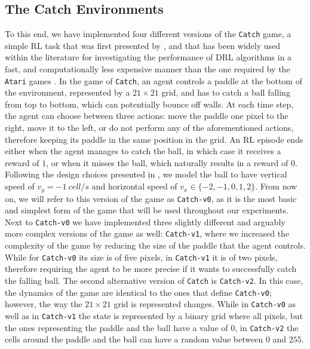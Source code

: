 \subsection{The Catch Environments}
\label{sec:catch_environments}

To this end, we have implemented four different versions of the \texttt{Catch} game, a simple RL task that was first presented by \citet{mnih2014recurrent}, and that has been widely used within the literature for investigating the performance of DRL algorithms in a fast, and computationally less expensive manner than the one required by the \texttt{Atari} games \cite{vanjos2018deep, aittahar2020empirical}. In the game of \texttt{Catch}, an agent controls a paddle at the bottom of the environment, represented by a $21 \times 21$ grid, and has to catch a ball falling from top to bottom, which can potentially bounce off walls.
At each time step, the agent can choose between three actions: move the paddle one pixel to the right, move it to the left, or do not perform any of the aforementioned actions, therefore keeping its paddle in the same position in the grid. An RL episode ends either when the agent manages to catch the ball, in which case it receives a reward of $1$, or when it misses the ball, which naturally results in a reward of $0$. Following the design choices presented in \cite{vanjos2017deep}, we model the ball to have vertical speed of $v_y=-1 \: cell/s$ and horizontal speed of $v_x \in \{-2,-1,0,1,2\}$. From now on, we will refer to this version of the game as \texttt{Catch-v0}, as it is the most basic and simplest form of the game that will be used throughout our experiments. Next to \texttt{Catch-v0} we have implemented three slightly different and arguably more complex versions of the game as well: \texttt{Catch-v1}, where we increased the complexity of the game by reducing the size of the paddle that the agent controls. While for \texttt{Catch-v0} its size is of five pixels, in \texttt{Catch-v1} it is of two pixels, therefore requiring the agent to be more precise if it wants to successfully catch the falling ball. The second alternative version of \texttt{Catch} is \texttt{Catch-v2}. In this case, the dynamics of the game are identical to the ones that define \texttt{Catch-v0}; however, the way the $21 \times 21$ grid is represented changes. While in \texttt{Catch-v0} as well as in \texttt{Catch-v1} the state is represented by a binary grid where all pixels, but the ones representing the paddle and the ball have a value of $0$, in \texttt{Catch-v2} the cells around the paddle and the ball can have a random value between $0$ and $255$. 
